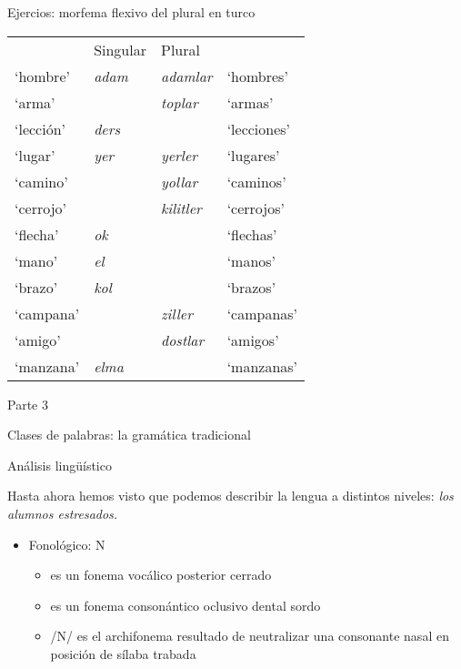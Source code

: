 \documentclass{beamer}
\begin{document}
\begin{frame}{Ejercios: morfema flexivo del plural en turco}
	
\begin{center}
\begin{tabular}{l l l l}
& Singular & Plural & \\
`hombre' & \it{adam} & \it{adamlar} & `hombres' \\
`arma' &  & \it{toplar} & `armas' \\
`lección' & \it{ders} &  & `lecciones' \\
`lugar' & \it{yer} & \it{yerler} & `lugares' \\
`camino' &  & \it{yollar} & `caminos' \\
`cerrojo' & & \it{kilitler} & `cerrojos' \\
`flecha' & \it{ok} &  & `flechas' \\
`mano' & \it{el} &  & `manos' \\
`brazo' & \it{kol} &  & `brazos' \\
`campana' &  & \it{ziller} & `campanas' \\
`amigo' &  & \it{dostlar} & `amigos' \\
`manzana' & \it{elma} &  & `manzanas' \\
\end{tabular}
\end{center}	

\end{frame}



\begin{frame}{Parte 3}

\begin{center}
  \LARGE{Clases de palabras: la gramática tradicional}
\end{center} 

\end{frame}

\begin{frame}{Análisis lingüístico}

Hasta ahora hemos visto que podemos describir la lengua a distintos niveles: \it{los alumnos estresados}.

\begin{itemize}
	\item Fonológico: N
	
	\begin{itemize}
		\item {} es un fonema vocálico posterior cerrado
		\item {} es un fonema consonántico oclusivo dental sordo
		\item /N/ es el archifonema resultado de neutralizar una consonante nasal en posición de sílaba trabada
	\end{itemize}
\end{itemize}

\end{frame}
\end{document}
